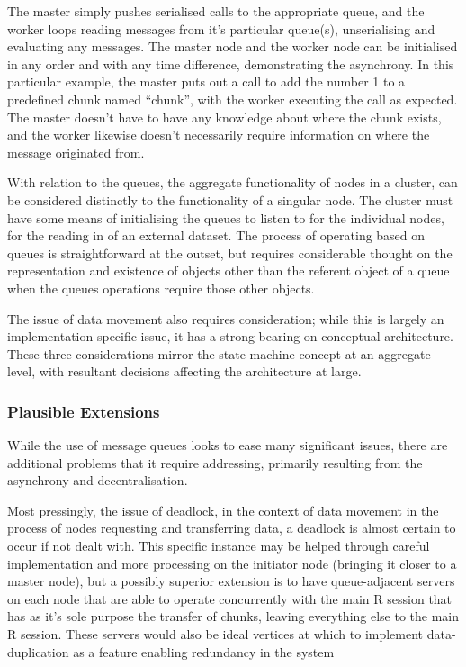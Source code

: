 The master simply pushes serialised calls to the appropriate queue, and
the worker loops reading messages from it's particular queue(s),
unserialising and evaluating any messages. The master node and the
worker node can be initialised in any order and with any time
difference, demonstrating the asynchrony. In this particular example,
the master puts out a call to add the number 1 to a predefined chunk
named ``chunk'', with the worker executing the call as expected. The
master doesn't have to have any knowledge about where the chunk exists,
and the worker likewise doesn't necessarily require information on where
the message originated from.

With relation to the queues, the aggregate functionality of nodes in a
cluster, can be considered distinctly to the functionality of a singular
node. The cluster must have some means of initialising the queues to
listen to for the individual nodes, for the reading in of an external
dataset. The process of operating based on queues is straightforward at
the outset, but requires considerable thought on the representation and
existence of objects other than the referent object of a queue when the
queues operations require those other objects.

The issue of data movement also requires consideration; while this is
largely an implementation-specific issue, it has a strong bearing on
conceptual architecture. These three considerations mirror the state
machine concept at an aggregate level, with resultant decisions
affecting the architecture at large.

\hypertarget{plausible-extensions}{%
\subsubsection{Plausible Extensions}\label{plausible-extensions}}

While the use of message queues looks to ease many significant issues,
there are additional problems that it require addressing, primarily
resulting from the asynchrony and decentralisation.

Most pressingly, the issue of deadlock, in the context of data movement
in the process of nodes requesting and transferring data, a deadlock is
almost certain to occur if not dealt with. This specific instance may be
helped through careful implementation and more processing on the
initiator node (bringing it closer to a master node), but a possibly
superior extension is to have queue-adjacent servers on each node that
are able to operate concurrently with the main R session that has as
it's sole purpose the transfer of chunks, leaving everything else to the
main R session. These servers would also be ideal vertices at which to
implement data-duplication as a feature enabling redundancy in the
system

